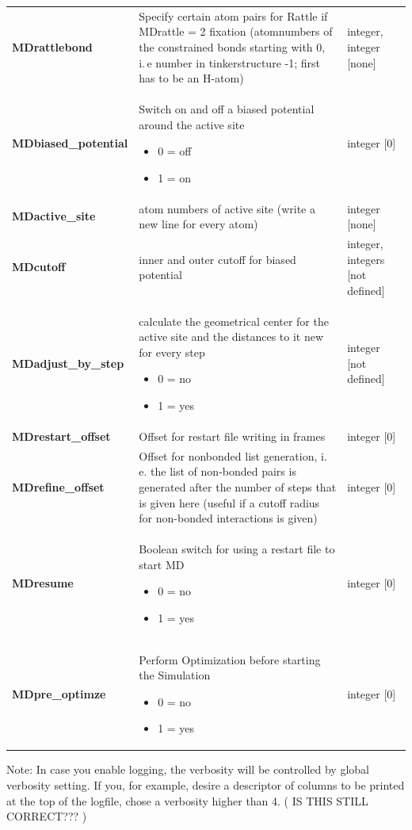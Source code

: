 \documentclass[10pt,a4paper]{article} %
\begin{document}
\begin{longtable}{|p{3.5cm}|p{5cm}|p{3cm}|}
		\textbf{MDrattlebond} & Specify certain atom pairs for Rattle\supercite{rattle} if MDrattle = 2 fixation (atomnumbers of the constrained bonds starting with 0, i.\,e number in tinkerstructure -1; first has to be an H-atom) & integer, integer [none] \\
			\textbf{MDbiased\_potential} & Switch on and off a biased potential around the active site \begin{itemize} \item 0 = off \item 1  = on \end{itemize} & integer [0] \\
		\textbf{MDactive\_site} & atom numbers of active site (write a new line for every atom) & integer [none] \\
		\textbf{MDcutoff} & inner and outer cutoff for biased potential & integer, integers [not defined] \\
		\textbf{MDadjust\_by\_step} & calculate the geometrical center for the active site and the distances to it new for every step \begin{itemize} \item 0 = no \item 1  = yes \end{itemize} & integer [not defined] \\
		\textbf{MDrestart\_offset} & Offset for restart file writing in frames & integer [0] \\
		\textbf{MDrefine\_offset} & Offset for nonbonded list generation, i.\,e. the list of non-bonded pairs is generated after the number of steps that is given here (useful if a cutoff radius for non-bonded interactions is given) & integer [0]  \\
		\textbf{MDresume} & Boolean switch for using a restart file to start MD\begin{itemize} \item 0 = no \item 1 = yes\end{itemize}& integer [0] \\
		\textbf{MDpre\_optimze} & Perform Optimization before starting the Simulation \begin{itemize} \item 0 = no \item 1 = yes\end{itemize}& integer [0] \\
			\end{longtable} 
	
	Note: In case you enable logging, the verbosity will be controlled by global verbosity setting. If you, for example, desire a descriptor of columns to be printed at the top of the logfile, chose a verbosity higher than 4. (	IS THIS STILL CORRECT??? ) \\
	
\end{document}
